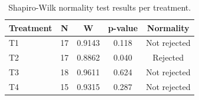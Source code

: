 \begin{table}[tbp]
\centering
\begin{tabular}{lcccc}
\toprule
Treatment & N & W & p-value & Normality \\ \midrule
T1 & 17 & 0.9143 & 0.118 & Not rejected \\
T2 & 17 & 0.8862 & 0.040 & Rejected \\
T3 & 18 & 0.9611 & 0.624 & Not rejected \\
T4 & 15 & 0.9315 & 0.287 & Not rejected \\
\bottomrule
\end{tabular}
\caption{Shapiro-Wilk normality test results per treatment.}
\label{tab:shapiro-wilk}
\end{table}

